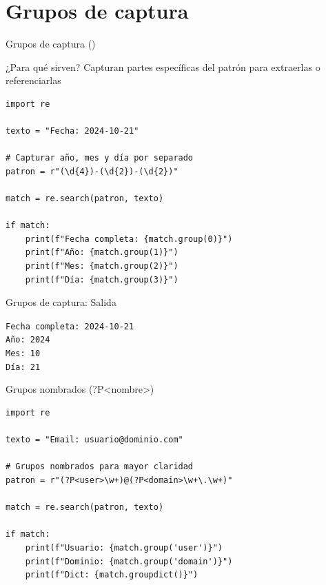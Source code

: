 \documentclass{beamer}
\begin{document}
\section{Grupos de captura}

\begin{frame}[fragile]{Grupos de captura () \faObjectGroup}
\begin{conceptbox}{¿Para qué sirven?}
Capturan partes específicas del patrón para extraerlas o referenciarlas
\end{conceptbox}

\begin{lstlisting}
import re

texto = "Fecha: 2024-10-21"

# Capturar año, mes y día por separado
patron = r"(\d{4})-(\d{2})-(\d{2})"

match = re.search(patron, texto)

if match:
    print(f"Fecha completa: {match.group(0)}")
    print(f"Año: {match.group(1)}")
    print(f"Mes: {match.group(2)}")
    print(f"Día: {match.group(3)}")
\end{lstlisting}
\end{frame}

\begin{frame}[fragile]{Grupos de captura: Salida \faArrowCircleRight}
\begin{tcolorbox}[colback=green!10,colframe=green,title={\small\faArrowCircleRight \ Salida},coltitle=fg0,left=3pt,right=3pt,top=3pt,bottom=3pt,boxsep=2pt]
\small\texttt{Fecha completa: 2024-10-21\\
Año: 2024\\
Mes: 10\\
Día: 21}
\end{tcolorbox}
\end{frame}

\begin{frame}[fragile]{Grupos nombrados (?P<nombre>) \faTag}
\begin{lstlisting}
import re

texto = "Email: usuario@dominio.com"

# Grupos nombrados para mayor claridad
patron = r"(?P<user>\w+)@(?P<domain>\w+\.\w+)"

match = re.search(patron, texto)

if match:
    print(f"Usuario: {match.group('user')}")
    print(f"Dominio: {match.group('domain')}")
    print(f"Dict: {match.groupdict()}")
\end{lstlisting}
\end{frame}
\end{document}
